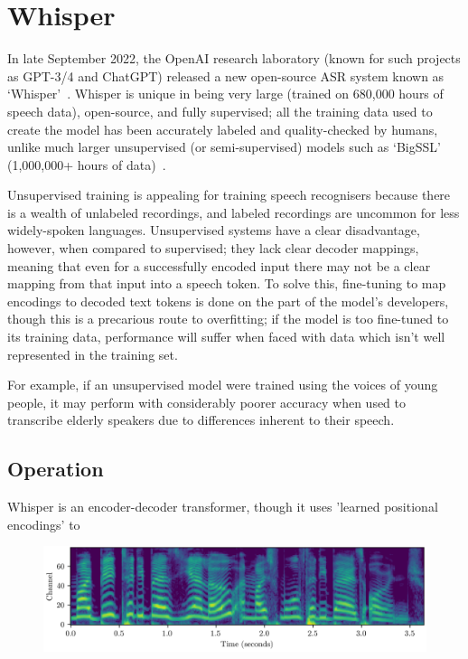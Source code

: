 
\section{Whisper}

In late September 2022, the OpenAI research laboratory (known for such projects as GPT-3/4 and ChatGPT) released a new open-source ASR system known as `Whisper'~\cite{whisper}.
Whisper is unique in being very large (trained on 680,000 hours of speech data), open-source, and fully supervised;
all the training data used to create the model has been accurately labeled and quality-checked by humans, unlike much larger unsupervised (or semi-supervised) models such as `BigSSL' (1,000,000+ hours of data)~\cite{bigssl}.

Unsupervised training is appealing for training speech recognisers because there is a wealth of unlabeled recordings, and labeled recordings are uncommon for less widely-spoken languages\cite{baevski2021}.
Unsupervised systems have a clear disadvantage, however, when compared to supervised; they lack clear decoder mappings\cite{whisper}, meaning that even for a successfully encoded input there may not be a clear mapping from that input into a speech token.
To solve this, fine-tuning to map encodings to decoded text tokens is done on the part of the model's developers, though this is a precarious route to overfitting;
if the model is too fine-tuned to its training data, performance will suffer when faced with data which isn't well represented in the training set.

For example, if an unsupervised model were trained using the voices of young people, it may perform with considerably poorer accuracy when used to transcribe elderly speakers due to differences inherent to their speech\cite{Horton2010}.

\subsection{Operation}

Whisper is an encoder-decoder transformer, though it uses 'learned positional encodings' to 

\begin{figure}[h!]
  \includegraphics[width=\textwidth]{figures/specgram.png}
\centering 
\end{figure}

